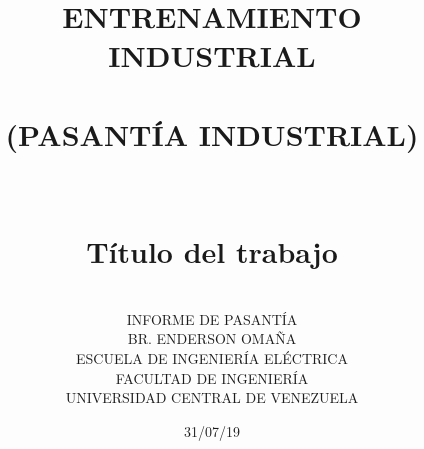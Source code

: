 \documentclass[12pt,letterpaper]{article}
\title{\normalsize \textbf{ENTRENAMIENTO INDUSTRIAL}\\
	{
	\\(PASANTÍA INDUSTRIAL)
	\\ 
	\\  
	\\
	\vspace*{1.0in}
	\large Título del trabajo
	\\
	\vspace{0.25in}
	\LARGE \textbf{}}
	\vspace*{1.0in}}
\author{
     \\ \hspace{4in} \normalsize INFORME DE PASANTÍA  
     \\ \hspace{4in} \normalsize BR. ENDERSON OMAÑA   
     \\ \hspace{4in} \normalsize ESCUELA DE INGENIERÍA ELÉCTRICA    
     \\ \hspace{4in} \normalsize FACULTAD DE INGENIERÍA   
     \\ \hspace{3in} \normalsize UNIVERSIDAD CENTRAL DE VENEZUELA    
    \vspace*{1.5in}} %
\date{\normalsize 31/07/19}
\begin{document}
    
     
    
    \begin{center}
        \tableofcontents    
    \end{center}
    \thispagestyle{empty}
    \newpage
    
    
    
    
    
    
    
    
    
    
    
    

\end{document}
